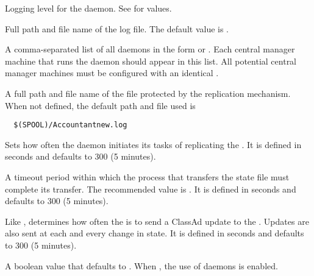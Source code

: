 \begin{description}
\label{param:HADDebug}
\item[\Macro{HAD\_DEBUG}]
  Logging level for the  daemon.
  See  for values.

\label{param:HADLog}
\item[\Macro{HAD\_LOG}]
  Full path and file name of the log file.
  The default value is .

\label{param:ReplicationList}
\item[\Macro{REPLICATION\_LIST}]
  A comma-separated list of all  daemons
  in the form  or .
  Each central manager machine that runs the  daemon
  should appear in this list.
  All potential central manager machines must be configured with
  an identical .

\label{param:StateFile}
\item[\Macro{STATE\_FILE}]
  A full path and file name of the file protected by the replication
  mechanism.
  When not defined, the default path and file used is
  \begin{verbatim}
  $(SPOOL)/Accountantnew.log
  \end{verbatim}

\label{param:ReplicationInterval}
\item[\Macro{REPLICATION\_INTERVAL}]
  Sets how often the  daemon initiates its tasks of
  replicating the .
  It is defined in seconds and defaults to 300 (5 minutes).

\label{param:MaxTransferLifetime}
\item[\Macro{MAX\_TRANSFER\_LIFETIME}]
  A timeout period within which the process that
  transfers the state file must complete its transfer.
  The recommended value is
  .
  It is defined in seconds and defaults to 300 (5 minutes).

\label{param:HADUpdateInterval}
\item[\Macro{HAD\_UPDATE\_INTERVAL}]
  Like ,
  determines how often the  is to send a ClassAd update
  to the .
  Updates are also sent at each and every change in state.
  It is defined in seconds and defaults to 300 (5 minutes).

\label{param:HADUseReplication}
\item[\Macro{HAD\_USE\_REPLICATION}]
  A boolean value that defaults to .
  When , the use of  daemons is enabled.


\end{description}
